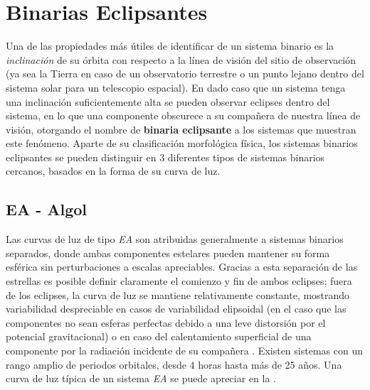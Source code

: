 \section{Binarias Eclipsantes}

Una de las propiedades más útiles de identificar de un sistema binario es
la \textit{inclinación} de su órbita con respecto a la línea de visión
del sitio de observación (ya sea la Tierra en caso de un observatorio
terrestre o un punto lejano dentro del sistema solar para un telescopio
espacial). En dado caso que un sistema tenga una inclinación suficientemente
alta se pueden observar eclipses dentro del sistema, en lo que una componente
obscurece a su compañera de nuestra línea de visión, otorgando el nombre de 
\textbf{binaria eclipsante} a los sistemas que muestran este fenómeno. 
Aparte de su clasificación morfológica física, los sistemas binarios eclipsantes
se pueden distinguir en 3 diferentes tipos de sistemas binarios cercanos,
basados en la forma de su curva de luz.

\subsection{EA - Algol}

Las curvas de luz de tipo \textit{EA} son atribuidas generalmente a sistemas
binarios separados, donde ambas componentes estelares pueden mantener su forma
esférica sin perturbaciones a escalas apreciables. Gracias a esta separación de
las estrellas es posible definir claramente el comienzo y fin de ambos eclipses;
fuera de los eclipses, la curva de luz se mantiene relativamente constante,
mostrando variabilidad despreciable en casos de variabilidad elipsoidal (en el
caso que las componentes no sean esferas perfectas debido a una leve distorsión
por el potencial gravitacional) o en caso del calentamiento superficial de una
componente por la radiación incidente de su compañera
. Existen sistemas con un rango amplio
de periodos orbitales, desde 4 horas hasta más de 25 años. Una curva de luz
típica de un sistema \textit{EA} se puede apreciar en la
.

